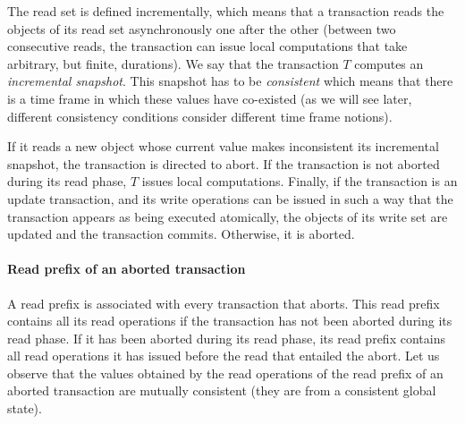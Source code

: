 The read set is  defined  incrementally,  which  means  that a 
transaction  reads  the objects of  its read set  asynchronously  one after
the other (between  two consecutive reads, the transaction 
can  issue local  computations   that  take  arbitrary, but finite,
durations). We  say  that the  transaction $T$ computes an  {\it incremental
snapshot}.  This snapshot has to be {\it consistent} which
means that there is a time frame in which these values have co-existed 
(as we will see later, different consistency conditions consider different  
time frame  notions). 

If it reads  a  new  object whose  current  value makes  inconsistent  its 
incremental snapshot, the transaction   is  directed to  abort. 
If the transaction is not aborted during its read 
phase, $T$ issues local computations. Finally,  if the transaction  is  
an update transaction, and its  write operations  can be issued 
in  such a way that the transaction  appears as  being executed
atomically,   the objects of its write set are updated  and the transaction
 commits.   Otherwise, it  is  aborted.

\paragraph{Read prefix of an aborted transaction}
A read prefix is associated with every transaction that aborts.
This read prefix contains all its read operations if the transaction 
has not been aborted  during its read phase.  If it has been  aborted during 
its read phase, its read prefix contains all read operations it has issued 
before the read that entailed the abort.  Let us observe that the values 
obtained by the read operations of the read prefix of an aborted transaction 
are mutually consistent (they are from a consistent global state). 


